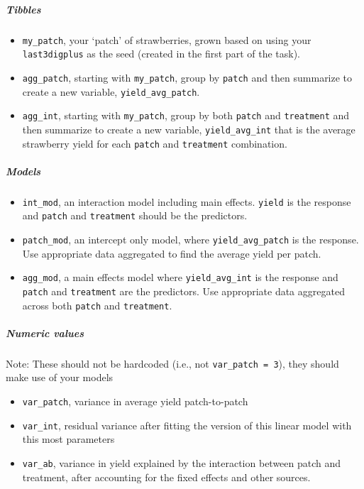 \documentclass[
  openany]{book}
\begin{document}
\hypertarget{tibbles}{%
\subparagraph{Tibbles}\label{tibbles}}

\begin{itemize}
\item
  \texttt{my\_patch}, your `patch' of strawberries, grown based on using your \texttt{last3digplus} as the seed (created in the first part of the task).
\item
  \texttt{agg\_patch}, starting with \texttt{my\_patch}, group by \texttt{patch} and then summarize to create a new variable, \texttt{yield\_avg\_patch}.
\item
  \texttt{agg\_int}, starting with \texttt{my\_patch}, group by both \texttt{patch} and \texttt{treatment} and then summarize to create a new variable, \texttt{yield\_avg\_int} that is the average strawberry yield for each \texttt{patch} and \texttt{treatment} combination.
\end{itemize}

\hypertarget{models}{%
\subparagraph{Models}\label{models}}

\begin{itemize}
\item
  \texttt{int\_mod}, an interaction model including main effects. \texttt{yield} is the response and \texttt{patch} and \texttt{treatment} should be the predictors.
\item
  \texttt{patch\_mod}, an intercept only model, where \texttt{yield\_avg\_patch} is the response. Use appropriate data aggregated to find the average yield per patch.
\item
  \texttt{agg\_mod}, a main effects model where \texttt{yield\_avg\_int} is the response and \texttt{patch} and \texttt{treatment} are the predictors. Use appropriate data aggregated across both \texttt{patch} and \texttt{treatment}.
\end{itemize}

\hypertarget{numeric-values}{%
\subparagraph{Numeric values}\label{numeric-values}}

Note: These should not be hardcoded (i.e., not \texttt{var\_patch\ =\ 3}), they should make use of your models

\begin{itemize}
\item
  \texttt{var\_patch}, variance in average yield patch-to-patch
\item
  \texttt{var\_int}, residual variance after fitting the version of this linear model with this most parameters
\item
  \texttt{var\_ab}, variance in yield explained by the interaction between patch and treatment, after accounting for the fixed effects and other sources.
\end{itemize}
\end{document}
